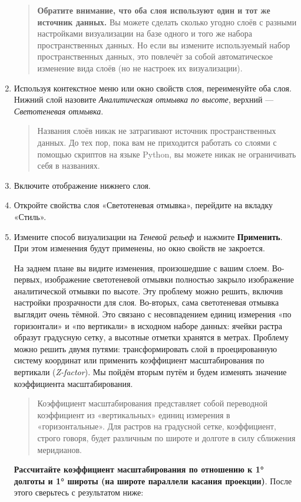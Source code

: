 \documentclass[
  12pt,
]{book}
\begin{document}
\begin{enumerate}
  \begin{quote}
  \textbf{Обратите внимание, что оба слоя используют один и тот же источник данных.} Вы можете сделать сколько угодно слоёв с разными настройками визуализации на базе одного и того же набора пространственных данных. Но если вы измените используемый набор пространственных данных, это повлечёт за собой автоматическое изменение вида слоёв (но не настроек их визуализации).
  \end{quote}
\item
  Используя контекстное меню или окно свойств слоя, переименуйте оба слоя. Нижний слой назовите \emph{Аналитическая отмывка по высоте}, верхний --- \emph{Светотеневая отмывка}.

  \begin{quote}
  Названия слоёв никак не затрагивают источник пространственных данных. До тех пор, пока вам не приходится работать со слоями с помощью скриптов на языке Python, вы можете никак не ограничивать себя в названиях.
  \end{quote}
\item
  Включите отображение нижнего слоя.
\item
  Откройте свойства слоя «Светотеневая отмывка», перейдите на вкладку «Стиль».
\item
  Измените способ визуализации на \emph{Теневой рельеф} и нажмите \textbf{Применить}. При этом изменения будут применены, но окно свойств не закроется.

  На заднем плане вы видите изменения, произошедшие с вашим слоем. Во-первых, изображение светотеневой отмывки полностью закрыло изображение аналитической отмывки по высоте. Эту проблему можно решить, включив настройки прозрачности для слоя. Во-вторых, сама светотеневая отмывка выглядит очень тёмной. Это связано с несовпадением единиц измерения «по горизонтали» и «по вертикали» в исходном наборе данных: ячейки растра образут градусную сетку, а высотные отметки хранятся в метрах. Проблему можно решить двумя путями: трансформировать слой в проецированную систему координат или применить коэффициент масштабирования по вертикали (\emph{Z-factor}). Мы пойдём вторым путём и будем изменять значение коэффициента масштабирования.

  \begin{quote}
  Коэффициент масштабирования представляет собой переводной коэффициент из «вертикальных» единиц измерения в «горизонтальные». Для растров на градусной сетке, коэффициент, строго говоря, будет различным по широте и долготе в силу сближения меридианов.
  \end{quote}

  \textbf{Рассчитайте коэффициент масштабирования по отношению к 1° долготы и 1° широты (на широте параллели касания проекции)}. После этого сверьтесь с результатом ниже:
\end{enumerate}
\end{document}
